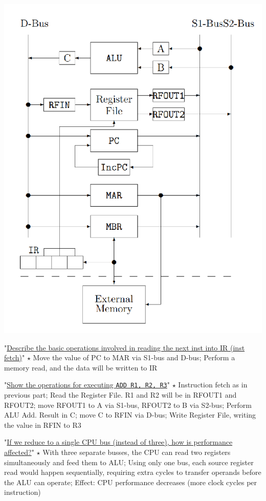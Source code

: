 \documentclass[a4paper]{article}
\begin{document}
\begin{multicols*}{2}
  \begin{minipage}{0.2\textwidth}
    \includegraphics[width=\textwidth]{./ex-cpu.png}
  \end{minipage}
  \begin{minipage}{0.25\textwidth}
    "\ul{Describe the basic operations involved in reading the next inst into IR (inst fetch)}"
    $\star$ Move the value of PC to MAR via S1-bus and D-bus; Perform a memory read, and the data will be written to IR

    "\ul{Show the operations for executing \texttt{ADD R1, R2, R3}}"
    $\star$ Instruction fetch as in previous part; Read the Register File. R1 and R2 will be in RFOUT1 and RFOUT2; move RFOUT1 to A via S1-bus, RFOUT2 to B via S2-bus; Perform ALU Add. Result in C; move C to RFIN via D-bus; Write Register File, writing the value in RFIN to R3

    "\ul{If we reduce to a single CPU bus (instead of three), how is performance affected?}"
    $\star$ With three separate busses, the CPU can read two registers simultaneously and feed them to ALU; Using only one bus, each source register read would happen sequentially, requiring extra cycles to transfer operands before the ALU can operate; Effect: CPU performance decreases (more clock cycles per instruction)
  \end{minipage}


\end{multicols*}
\end{document}
